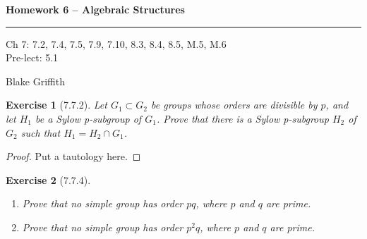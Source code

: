 \documentclass[12pt]{article}
\newtheorem*{exer}{Exercise}
\begin{document}
\textbf{Homework 6 -- Algebraic Structures} \\

\hrule

\begin{minipage}{.80\linewidth}
    \flushleft
    Ch 7: 7.2, 7.4, 7.5, 7.9, 7.10, 8.3, 8.4, 8.5, M.5, M.6 \\ 
    Pre-lect: 5.1 \\
\end{minipage}
\begin{minipage}{.20\linewidth}
    \flushright
    Blake Griffith
\end{minipage}


\begin{exer}[7.7.2]

    Let $G_1 \subset G_2$ be groups whose orders are divisible by $p$,
    and let $H_1$ be a Sylow p-subgroup of $G_1$. Prove that there is a
    Sylow p-subgroup $H_2$ of $G_2$ such that $H_1 = H_2 \cap G_1$.

\end{exer}

\begin{proof}

    Put a tautology here.

\end{proof}


\begin{exer}[7.7.4]

    \begin{enumerate}
        \item Prove that no simple group has order $pq$, where $p$ and
            $q$ are prime.

        \item Prove that no simple group has order $p^2q$, where $p$ and
            $q$ are prime.

    \end{enumerate}

\end{exer}
\end{document}
